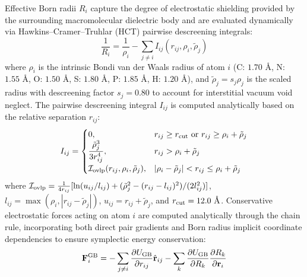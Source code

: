 \documentclass[journal=jpcbfk,manuscript=article]{achemso}
\begin{document}
Effective Born radii $R_i$ capture the degree of electrostatic shielding provided by the surrounding macromolecular dielectric body and are evaluated dynamically via Hawkins--Cramer--Truhlar (HCT) pairwise descreening integrals:\cite{hawkins1996parameterized,onufriev2004exploring}
\begin{equation}
\frac{1}{R_i} = \frac{1}{\rho_i} - \sum_{j \neq i} I_{ij}(r_{ij}, \rho_i, \tilde{\rho}_j)
\end{equation}
where $\rho_i$ is the intrinsic Bondi van der Waals radius of atom $i$ (C: $1.70\text{ \AA}$, N: $1.55\text{ \AA}$, O: $1.50\text{ \AA}$, S: $1.80\text{ \AA}$, P: $1.85\text{ \AA}$, H: $1.20\text{ \AA}$), and $\tilde{\rho}_j = s_j \rho_j$ is the scaled radius with descreening factor $s_j = 0.80$ to account for interstitial vacuum void neglect. The pairwise descreening integral $I_{ij}$ is computed analytically based on the relative separation $r_{ij}$:
\begin{equation}
I_{ij} = 
\begin{cases}
0, & r_{ij} \ge r_{\rm cut} \text{ or } r_{ij} \ge \rho_i + \tilde{\rho}_j \\
\dfrac{\tilde{\rho}_j^3}{3 r_{ij}^4}, & r_{ij} > \rho_i + \tilde{\rho}_j \\
\mathcal{I}_{\rm ovlp}(r_{ij}, \rho_i, \tilde{\rho}_j), & |\rho_i - \tilde{\rho}_j| < r_{ij} \le \rho_i + \tilde{\rho}_j
\end{cases}
\end{equation}
where $\mathcal{I}_{\rm ovlp} = \frac{1}{4 r_{ij}} [ \ln( u_{ij} / l_{ij} ) + (\tilde{\rho}_j^2 - (r_{ij} - l_{ij})^2)/(2 l_{ij}^2) ]$, $l_{ij} = \max(\rho_i, |r_{ij} - \tilde{\rho}_j|)$, $u_{ij} = r_{ij} + \tilde{\rho}_j$, and $r_{\rm cut} = 12.0\text{ \AA}$. Conservative electrostatic forces acting on atom $i$ are computed analytically through the chain rule, incorporating both direct pair gradients and Born radius implicit coordinate dependencies to ensure symplectic energy conservation:
\begin{equation}
\mathbf{F}_i^{\rm GB} = - \sum_{j \neq i} \frac{\partial U_{\rm GB}}{\partial r_{ij}} \hat{\mathbf{r}}_{ij} - \sum_{k} \frac{\partial U_{\rm GB}}{\partial R_k} \frac{\partial R_k}{\partial \mathbf{r}_i}
\end{equation}
\end{document}

